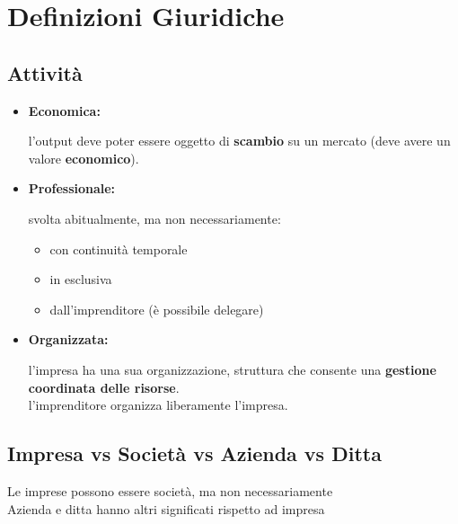 \documentclass[../main.tex]{subfiles}
\begin{document}
\section{Definizioni Giuridiche}

\subsection{Attività}

    \begin{itemize}
        \item \textbf{Economica:}
        
            l'output deve poter essere oggetto di \textbf{scambio} su un mercato (deve avere un valore \textbf{economico}).
        
        \item \textbf{Professionale:}
        
            svolta abitualmente, ma non necessariamente:
            \begin{itemize}
                \item con continuità temporale
                \item in esclusiva
                \item dall'imprenditore (è possibile delegare)
            \end{itemize}
        
        \item \textbf{Organizzata:}
        
            l'impresa ha una sua organizzazione, struttura che consente una \textbf{gestione coordinata delle risorse}.\\		
            l'imprenditore organizza liberamente l'impresa.
        
    \end{itemize}	

\subsection{Impresa vs Società vs Azienda vs Ditta}
    
    Le imprese possono essere società, ma non necessariamente\\		
    Azienda e ditta hanno altri significati rispetto ad impresa
    
\end{document}

